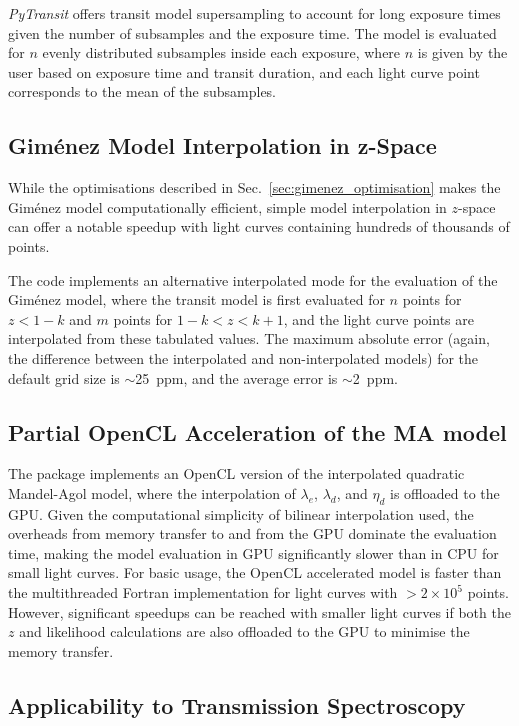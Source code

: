 \documentclass[usenatbib,usegraphicx,useAMS]{mn2e}
\newcommand{\gimenez}{Gim\'enez\xspace}
\newcommand{\pytransit}{\textit{PyTransit}\xspace}
\begin{document}
{\pytransit offers transit model supersampling to account for long exposure times given the number of subsamples and the 
exposure time. The model is evaluated for $n$ evenly distributed subsamples inside each exposure, where $n$ is 
given by the user based on exposure time and transit duration, and each light curve point corresponds to the mean of 
the subsamples.

\subsection{\gimenez Model Interpolation in z-Space}
\label{sec:implementation:gimenez_interpolation}
While the optimisations described in Sec.~\ref{sec:gimenez_optimisation} makes the Gim\'enez model computationally 
efficient, simple model interpolation in $z$-space can offer a notable speedup with light curves containing hundreds of 
thousands of points. 

The code implements an alternative interpolated mode for the evaluation of the \gimenez model, where the transit model 
is first evaluated for $n$ points for $z<1-k$ and $m$ points for $1-k < z < k+1$, and the light curve points are 
interpolated from these tabulated values. The maximum absolute error (again, the difference between the
interpolated and non-interpolated models) for the default grid size is $\sim$25~ppm, and the average error is
$\sim$2~ppm.

\subsection{Partial OpenCL Acceleration of the MA model}
\label{sec:implementation:opencl}
The package implements an OpenCL version of the interpolated quadratic Mandel-Agol model, where the 
interpolation of  $\lambda_e$, $\lambda_d$, and $\eta_d$ is offloaded to the GPU. Given the computational simplicity of 
bilinear interpolation used, the overheads from memory transfer to and from the GPU dominate the evaluation time, making 
the model evaluation in GPU significantly slower than in CPU for small light curves. For basic usage, the OpenCL 
accelerated model is faster than the multithreaded Fortran implementation for light curves with $> 2\times10^5$ points. 
However, significant speedups can be reached with smaller light curves if both the $z$ and likelihood calculations are 
also offloaded to the GPU to minimise the memory transfer.

\subsection{Applicability to Transmission Spectroscopy}
\label{sec:implementation:applicability}

}
\end{document}
